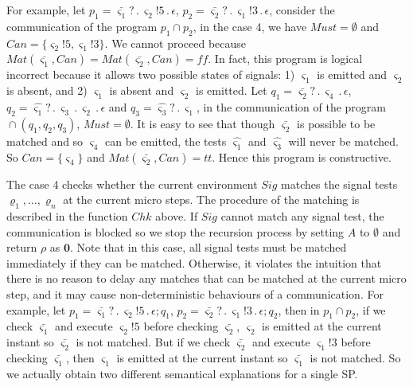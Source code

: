 \documentclass{fcs}
\newcommand{\sig}[0]{\varsigma}
\newcommand{\halt}[0]{\mathbf{0}}
\newcommand{\true}[0]{\mathit{tt}}
\newcommand{\false}[0]{\mathit{ff}}
\DeclareMathOperator{\seq}{;}
\DeclareMathOperator{\para}{\cap}
\newcommand{\Must}[0]{\mathit{Must}}
\newcommand{\Chk}[0]{\mathit{Chk}}
\newcommand{\Match}[0]{\mathit{Mat}}
\DeclareMathOperator{\nex}{.}
\newcommand{\Sigs}[0]{\mathit{Sig}}
\newcommand{\SV}[0]{\Xi}
\newcommand{\Can}[0]{\mathit{Can}}
\begin{document}
For example, let $p_1 = \bar{\sig_1}?\nex \sig_2!5\nex \epsilon$, $p_2 = \bar{\sig_2}?\nex \sig_1!3\nex \epsilon$, consider the communication of the program $p_1\para p_2$,
in the case 4, we have $\Must = \emptyset$ and $\Can = \{\sig_2!5, \sig_1!3\}$.
We cannot proceed because $\Match(\bar{\sig_1}, \Can) = \Match(\bar{\sig_2}, \Can) = \false$.
In fact, this program is logical incorrect because it allows two possible states of signals: 1) $\sig_1$ is emitted and $\sig_2$ is absent, and 2) $\sig_1$ is absent and $\sig_2$ is emitted.
Let $q_1 = \bar{\sig_2}?\nex \sig_4\nex \epsilon$, $q_2 = \hat{\sig_1}?\nex \sig_3\nex \sig_2\nex \epsilon$ and $q_3=\hat{\sig_3}?\nex \sig_1$,
in the communication of the program $\para(q_1,q_2,q_3)$, $\Must = \emptyset$.
It is easy to see that though $\bar{\sig_2}$ is possible to be matched and so $\sig_4$ can be emitted, the tests $\hat{\sig_1}$ and $\hat{\sig_3}$ will never be matched.
So $\Can = \{\sig_4\}$ and $\Match(\bar{\sig_2},\Can)=\true$. Hence this program is constructive.

\ifx
The case 4 checks whether the current environment $\Sigs$ matches the signal tests $\varrho_1,...,\varrho_n$ at the current micro steps.
The procedure of the matching is described in the function $\Chk$ above.
If $\Sigs$ cannot match any signal test, the communication is blocked so we stop the recursion process by setting $A$ to $\emptyset$ and return $\rho$ as $\halt$.
Note that in this case, all signal tests must be matched immediately if they can be matched.
Otherwise, it violates the intuition that there is no reason to delay any matches that can be matched at the current micro step, and
it may cause non-deterministic behaviours of a communication.
For example, let $p_1 = \bar{\sig_1}?\nex \sig_2!5\nex \epsilon\seq q_1$, $p_2 = \bar{\sig_2}?\nex \sig_1!3\nex \epsilon\seq q_2$,
then in $p_1\para p_2$,
if we check $\bar{\sig_1}$ and execute $\sig_2!5$ before checking $\bar{\sig_2}$, $\sig_2$ is emitted at the current instant so $\bar{\sig_2}$ is not matched.
But if we check $\bar{\sig_2}$ and execute $\sig_1!3$ before checking $\bar{\sig_1}$, then $\sig_1$ is emitted at the current instant so $\bar{\sig_1}$ is not matched.
So we actually obtain two different semantical explanations for a single SP.
\fi
\end{document}
